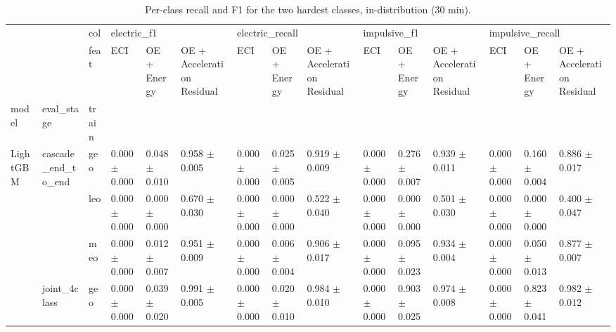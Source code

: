 \begin{table}
\centering
\caption{Per-class recall and F1 for the two hardest classes, in-distribution (30 min).}
\label{tab:perclass}
\begin{tabular}{lllllllllllllll}
\toprule
            &              & col & \multicolumn{3}{l}{electric_f1} & \multicolumn{3}{l}{electric_recall} & \multicolumn{3}{l}{impulsive_f1} & \multicolumn{3}{l}{impulsive_recall} \\
            &              & feat &                ECI &        OE + Energy & OE + Acceleration Residual &                ECI &        OE + Energy & OE + Acceleration Residual &                ECI &        OE + Energy & OE + Acceleration Residual &                ECI &        OE + Energy & OE + Acceleration Residual \\
model & eval_stage & train &                    &                    &                            &                    &                    &                            &                    &                    &                            &                    &                    &                            \\
\midrule
LightGBM & cascade_end_to_end & geo &  0.000 $\pm$ 0.000 &  0.048 $\pm$ 0.010 &          0.958 $\pm$ 0.005 &  0.000 $\pm$ 0.000 &  0.025 $\pm$ 0.005 &          0.919 $\pm$ 0.009 &  0.000 $\pm$ 0.000 &  0.276 $\pm$ 0.007 &          0.939 $\pm$ 0.011 &  0.000 $\pm$ 0.000 &  0.160 $\pm$ 0.004 &          0.886 $\pm$ 0.017 \\
            &              & leo &  0.000 $\pm$ 0.000 &  0.000 $\pm$ 0.000 &          0.670 $\pm$ 0.030 &  0.000 $\pm$ 0.000 &  0.000 $\pm$ 0.000 &          0.522 $\pm$ 0.040 &  0.000 $\pm$ 0.000 &  0.000 $\pm$ 0.000 &          0.501 $\pm$ 0.030 &  0.000 $\pm$ 0.000 &  0.000 $\pm$ 0.000 &          0.400 $\pm$ 0.047 \\
            &              & meo &  0.000 $\pm$ 0.000 &  0.012 $\pm$ 0.007 &          0.951 $\pm$ 0.009 &  0.000 $\pm$ 0.000 &  0.006 $\pm$ 0.004 &          0.906 $\pm$ 0.017 &  0.000 $\pm$ 0.000 &  0.095 $\pm$ 0.023 &          0.934 $\pm$ 0.004 &  0.000 $\pm$ 0.000 &  0.050 $\pm$ 0.013 &          0.877 $\pm$ 0.007 \\
            & joint_4class & geo &  0.000 $\pm$ 0.000 &  0.039 $\pm$ 0.020 &          0.991 $\pm$ 0.005 &  0.000 $\pm$ 0.000 &  0.020 $\pm$ 0.010 &          0.984 $\pm$ 0.010 &  0.000 $\pm$ 0.000 &  0.903 $\pm$ 0.025 &          0.974 $\pm$ 0.008 &  0.000 $\pm$ 0.000 &  0.823 $\pm$ 0.041 &          0.982 $\pm$ 0.012 \\

\end{tabular}
\end{table}
